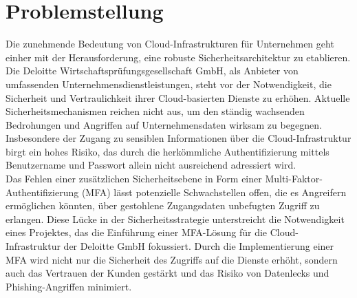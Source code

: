 \section{Problemstellung}
\label{sec:Problemstellung}
Die zunehmende Bedeutung von Cloud-Infrastrukturen für Unternehmen geht einher mit der Herausforderung, 
eine robuste Sicherheitsarchitektur zu etablieren. Die Deloitte Wirtschaftsprüfungsgesellschaft GmbH, 
als Anbieter von umfassenden Unternehmensdienstleistungen, steht vor der Notwendigkeit, die Sicherheit 
und Vertraulichkeit ihrer Cloud-basierten Dienste zu erhöhen. Aktuelle Sicherheitsmechanismen reichen 
nicht aus, um den ständig wachsenden Bedrohungen und Angriffen auf Unternehmensdaten wirksam zu 
begegnen. Insbesondere der Zugang zu sensiblen Informationen über die Cloud-Infrastruktur birgt ein 
hohes Risiko, das durch die herkömmliche Authentifizierung mittels Benutzername und Passwort allein 
nicht ausreichend adressiert wird.
\\Das Fehlen einer zusätzlichen Sicherheitsebene in Form einer Multi-Faktor-Authentifizierung (MFA) 
lässt potenzielle Schwachstellen offen, die es Angreifern ermöglichen könnten, über gestohlene 
Zugangsdaten unbefugten Zugriff zu erlangen. Diese Lücke in der Sicherheitsstrategie unterstreicht die 
Notwendigkeit eines Projektes, das die Einführung einer MFA-Lösung für die Cloud-Infrastruktur der 
Deloitte GmbH fokussiert. Durch die Implementierung einer MFA wird nicht nur die Sicherheit des 
Zugriffs auf die Dienste erhöht, sondern auch das Vertrauen der Kunden gestärkt und das Risiko von 
Datenlecks und Phishing-Angriffen minimiert.